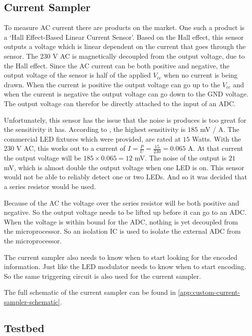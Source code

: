 \subsection{Current Sampler}

To measure AC current there are products on the market.
One such a product is a `Hall Effect-Based Linear Current Sensor'.
Based on the Hall effect, this sensor outputs a voltage which is linear dependent on the current that goes through the sensor.
The 230 V AC is magnetically decoupled from the output voltage, due to the Hall effect.
Since the AC current can be both positive and negative, the output voltage of the sensor is half of the applied $V_{cc}$ when no current is being drawn.
When the current is positive the output voltage can go up to the $V_{cc}$ and when the current is negative the output voltage can go down to the GND voltage. 
The output voltage can therefor be directly attached to the input of an ADC.


Unfortunately, this sensor has the issue that the noise is produces is too great for the sensitivity it has.
According to \cite{hall-ac-current-sensor-datasheet}, the highest sensitivity is $185$ mV / A.
The commercial LED fixtures which were provided, are rated at $15$ Watts.
With the 230 V AC, this works out to a current of $I = \frac{P}{U} = \frac{15}{230} = 0.065$ A.
At that current the output voltage will be $185 \times 0.065 = 12$ mV.
The noise of the output is $21$ mV, which is almost double the output voltage when one LED is on.
This sensor would not be able to reliably detect one or two LEDs.
And so it was decided that a series resistor would be used.

Because of the AC the voltage over the series resistor will be both positive and negative.
So the output voltage needs to be lifted up before it can go to an ADC.
When the voltage is within bound for the ADC, nothing is yet decoupled from the microprocessor.
So an isolation IC is used to isolate the external ADC from the microprocessor.

The current sampler also needs to know when to start looking for the encoded information.
Just like the LED modulator needs to know when to start encoding.
So the same triggering circuit is also used for the current sampler.

The full schematic of the current sampler can be found in \autoref{app:custom-current-sampler-schematic}.





\subsection{Testbed}
\label{subsec:ac-testbed}

